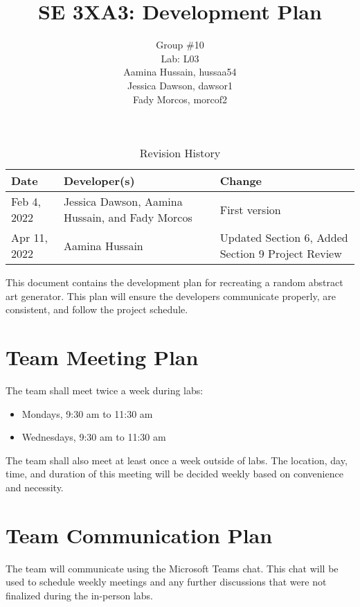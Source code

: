\documentclass{article}
\title{SE 3XA3: Development Plan}
\author{Group \#10
        \\Lab: L03
		\\ Aamina Hussain, hussaa54
		\\ Jessica Dawson, dawsor1
		\\ Fady Morcos, morcof2
}
\date{}
\begin{document}
\newpage
\maketitle
\newpage

\begin{table}[h!]
\caption{Revision History} \label{TblRevisionHistory}
\begin{tabularx}{\textwidth}{llX}
\toprule
\textbf{Date} & \textbf{Developer(s)} & \textbf{Change}\\
\midrule
Feb 4, 2022 & Jessica Dawson, Aamina Hussain, and Fady Morcos & First version\\
\color{red} Apr 11, 2022 & \color{red} Aamina Hussain & \color{red}Updated Section 6, Added Section 9 Project Review\\
\bottomrule
\end{tabularx}
\end{table}

\newpage


\maketitle

This document contains the development plan for recreating a random abstract art generator. This plan will ensure the developers communicate properly, are consistent, and follow the project schedule.

\section{Team Meeting Plan}

The team shall meet twice a week during labs:
\begin{itemize}
    \item Mondays, 9:30 am to 11:30 am
    \item Wednesdays, 9:30 am to 11:30 am
\end{itemize}
The team shall also meet at least once a week outside of labs. The location, day, time, and duration of this meeting will be decided weekly based on convenience and necessity.

\section{Team Communication Plan}

The team will communicate using the Microsoft Teams chat. This chat will be used to schedule weekly meetings and any further discussions that were not finalized during the in-person labs.
\end{document}
